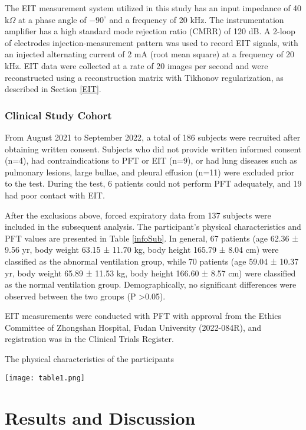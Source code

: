 \documentclass[journal,twoside,web]{ieeecolor}
\begin{document}
The EIT measurement system utilized in this study has an input impedance of 40 k$\Omega$ at a phase angle of $-90^{\circ}$ and a frequency of 20 kHz. The instrumentation amplifier has a high standard mode rejection ratio (CMRR) of 120 dB. A 2-loop of electrodes injection-measurement pattern\cite{zhang2022deep} was used to record EIT signals, with an injected alternating current of 2 mA (root mean square) at a frequency of 20 kHz. EIT data were collected at a rate of 20 images per second and were reconstructed using a reconstruction matrix with Tikhonov regularization, as described in Section \ref{EIT}.

\subsubsection{Clinical Study Cohort}
From August 2021 to September 2022, a total of 186 subjects were recruited after obtaining written consent. Subjects who did not provide written informed consent (n=4), had contraindications to PFT or EIT (n=9), or had lung diseases such as pulmonary lesions, large bullae, and pleural effusion (n=11) were excluded prior to the test. During the test, 6 patients could not perform PFT adequately, and 19 had poor contact with EIT.

After the exclusions above, forced expiratory data from 137 subjects were included in the subsequent analysis. The participant's physical characteristics and PFT values are presented in Table \ref{infoSub}.
In general, 67 patients (age 62.36 ± 9.56 yr, body weight 63.15 ± 11.70 kg, body height 165.79 ± 8.04 cm) were classified as the abnormal ventilation group, while 70 patients (age 59.04 ± 10.37 yr, body weight 65.89 ± 11.53 kg, body height 166.60 ± 8.57 cm) were classified as the normal ventilation group. Demographically, no significant differences were observed between the two groups (P \textgreater  0.05).

EIT measurements were conducted with PFT with approval from the Ethics Committee of Zhongshan Hospital, Fudan University (2022-084R), and registration was in the Clinical Trials Register.

\begin{table}[!htbp]
	\caption{The physical characteristics of the participants}
	\texttt{[image: table1.png]}
	\label{infoSub}
\end{table}

\section{Results and Discussion}
\label{dis}
\end{document}
